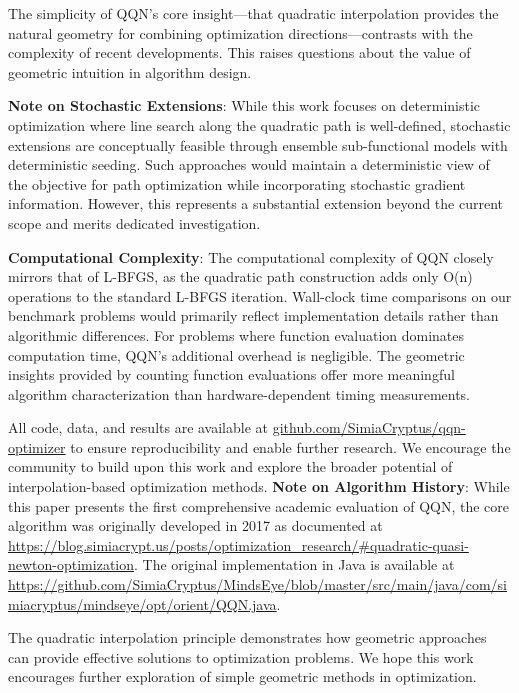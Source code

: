 The simplicity of QQN's core insight---that quadratic interpolation provides the natural geometry for combining
optimization directions---contrasts with the complexity of recent developments. This raises questions about the value of
geometric intuition in algorithm design.

\textbf{Note on Stochastic Extensions}: While this work focuses on deterministic optimization where line search along the
quadratic path is well-defined, stochastic extensions are conceptually feasible through ensemble sub-functional models
with deterministic seeding. Such approaches would maintain a deterministic view of the objective for path optimization
while incorporating stochastic gradient information. However, this represents a substantial extension beyond the current
scope and merits dedicated investigation.

\textbf{Computational Complexity}: The computational complexity of QQN closely mirrors that of L-BFGS, as the quadratic path
construction adds only O(n) operations to the standard L-BFGS iteration. Wall-clock time comparisons on our benchmark
problems would primarily reflect implementation details rather than algorithmic differences. For problems where function
evaluation dominates computation time, QQN's additional overhead is negligible. The geometric insights provided by
counting function evaluations offer more meaningful algorithm characterization than hardware-dependent timing
measurements.

All code, data, and results are available at \href{https://github.com/SimiaCryptus/qqn-optimizer/}{github.com/SimiaCryptus/qqn-optimizer} to
ensure reproducibility and enable further research. We encourage the community to build upon this work and explore the
broader potential of interpolation-based optimization methods.
\textbf{Note on Algorithm History}: While this paper presents the first comprehensive academic evaluation of QQN, the core
algorithm was originally developed in 2017 as documented at
\url{https://blog.simiacrypt.us/posts/optimization_research/#quadratic-quasi-newton-optimization}. The original implementation
in Java is available at \url{https://github.com/SimiaCryptus/MindsEye/blob/master/src/main/java/com/simiacryptus/mindseye/opt/orient/QQN.java}.

The quadratic interpolation principle demonstrates how geometric approaches can provide
effective solutions to optimization problems. We hope this work encourages further
exploration of simple geometric methods in optimization.

